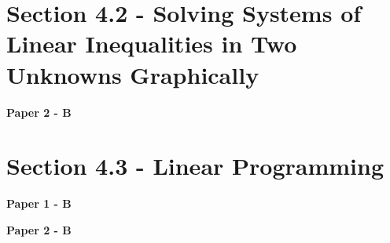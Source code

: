 \documentclass[12pt, a4paper]{article}
\begin{document}
\section*{Section 4.2 - Solving Systems of Linear Inequalities in Two Unknowns Graphically \NF}\label{section:5-4-2}

\textbf{Paper 2 - B}
\begin{enumx}[label=\arabic*.,start=1]
\item {}\label{DSE2012S-CoreP2-Q35} 
\item {}\label{DSE2012-CoreP2-Q36} 
\item {}\label{DSE2015-CoreP2-Q36} 
\end{enumx}




\section*{Section 4.3 - Linear Programming \NF}\label{section:5-4-3}

\textbf{Paper 1 - B}
\begin{enumx}[label=\arabic*.,start=4]
\item {}\label{DSE2021-CoreP1-Q16} 
\end{enumx}
\textbf{Paper 2 - B}
\begin{enumx}[label=\arabic*.,start=5]
\item {}\label{DSE2013-CoreP2-Q37} 
\item {}\label{DSE2016-CoreP2-Q35} 
\item {}\label{DSE2017-CoreP2-Q37} 
\item {}\label{DSE2018-CoreP2-Q34} 
\item {}\label{DSE2019-CoreP2-Q35} 
\item {}\label{DSE2020-CoreP2-Q36} 
\item {}\label{DSE2022-CoreP2-Q36} 
\item {}\label{DSE2023-CoreP2-Q37} 
\item {}\label{DSE2024-CoreP2-Q37} 
\end{enumx}
\end{document}
